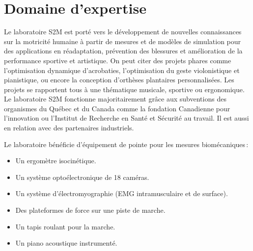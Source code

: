         \section{Domaine d'expertise}
        
Le laboratoire S2M est porté vers le développement de nouvelles connaissances sur la motricité humaine à
partir de mesures et de modèles de simulation pour des applications en réadaptation, prévention des
blessures et amélioration de la performance sportive et artistique. On peut citer des projets phares comme l'optimisation dynamique d'acrobaties, l'optimisation du geste violonistique et pianistique, ou encore la conception d’orthèses plantaires personnalisées. Les projets se rapportent tous à une thématique musicale, sportive ou ergonomique.
Le laboratoire S2M fonctionne majoritairement grâce aux subventions des organismes du
Québec et du Canada comme la fondation Canadienne pour l’innovation ou l’Institut de Recherche en Santé et Sécurité au travail. Il est aussi en relation avec des partenaires industriels. %


Le laboratoire bénéficie d’équipement de pointe pour les mesures biomécaniques : 
\begin{itemize}
\setlength\itemsep{-0.5em}
\item Un ergomètre isocinétique.
\item Un système optoélectronique de 18 caméras.
\item Un système d'électromyographie (EMG intramusculaire et de surface).
\item Des plateformes de force sur une piste de marche.
\item Un tapis roulant pour la marche.
\item Un piano acoustique instrumenté.  
\end{itemize}
\newpage

    
